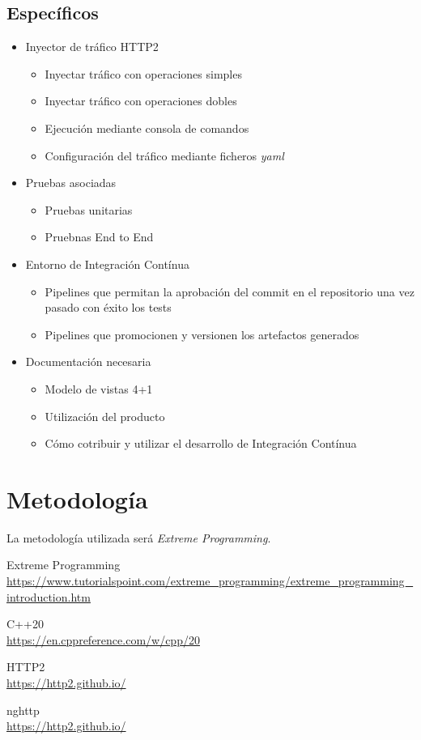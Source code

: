 \subsection{Específicos}
\begin{itemize}
    \item Inyector de tráfico HTTP2
    \begin{itemize}
        \item Inyectar tráfico con operaciones simples
        \item Inyectar tráfico con operaciones dobles
        \item Ejecución mediante consola de comandos
        \item Configuración del tráfico mediante ficheros \emph{yaml}
    \end{itemize}
    \item Pruebas asociadas
    \begin{itemize}
        \item Pruebas unitarias
        \item Pruebnas End to End
    \end{itemize}
    \item Entorno de Integración Contínua
    \begin{itemize}
        \item Pipelines que permitan la aprobación del commit en el repositorio una vez pasado con éxito los tests
        \item Pipelines que promocionen y versionen los artefactos generados
    \end{itemize}
    \item Documentación necesaria
    \begin{itemize}
        \item Modelo de vistas 4+1
        \item Utilización del producto
        \item Cómo cotribuir y utilizar el desarrollo de Integración Contínua
    \end{itemize}
\end{itemize}

\section{Metodología}
La metodología utilizada será \emph{Extreme Programming}.


\newpage
\begin{thebibliography}{Bibliografía}
Extreme Programming
\\\url{https://www.tutorialspoint.com/extreme_programming/extreme\_programming\_introduction.htm}

C++20
\\\url{https://en.cppreference.com/w/cpp/20}

HTTP2
\\\url{https://http2.github.io/}

nghttp
\\\url{https://http2.github.io/}
\end{thebibliography}